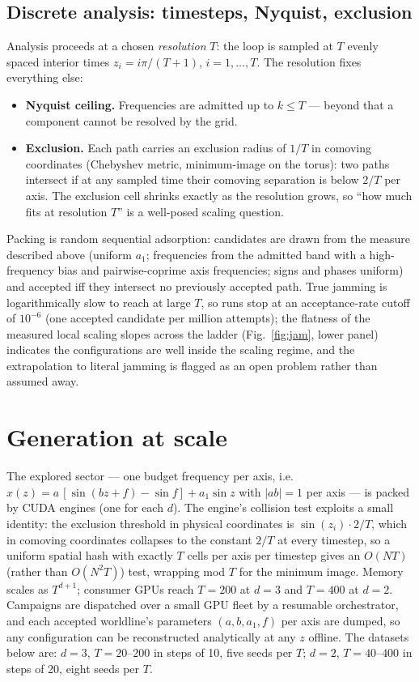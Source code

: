 \documentclass[11pt]{article}
\begin{document}
\subsection{Discrete analysis: timesteps, Nyquist, exclusion}
\label{sec:discrete}

Analysis proceeds at a chosen \emph{resolution} $T$: the loop is sampled at
$T$ evenly spaced interior times $z_i = i\pi/(T{+}1)$, $i = 1,\ldots,T$. The
resolution fixes everything else:
\begin{itemize}
  \item \textbf{Nyquist ceiling.} Frequencies are admitted up to $k \le T$
        --- beyond that a component cannot be resolved by the grid.
  \item \textbf{Exclusion.} Each path carries an exclusion radius of $1/T$
        in comoving coordinates (Chebyshev metric, minimum-image on the
        torus): two paths intersect if at any sampled time their comoving
        separation is below $2/T$ per axis. The exclusion cell shrinks
        exactly as the resolution grows, so ``how much fits at resolution
        $T$'' is a well-posed scaling question.
\end{itemize}
Packing is random sequential adsorption: candidates are drawn from the
measure described above (uniform $a_1$; frequencies from the admitted band
with a high-frequency bias and pairwise-coprime axis frequencies; signs and
phases uniform) and accepted iff they intersect no previously accepted path.
True jamming is logarithmically slow to reach at large $T$, so runs stop at
an acceptance-rate cutoff of $10^{-6}$ (one accepted candidate per million
attempts); the flatness of the measured local scaling slopes across the
ladder (Fig.~\ref{fig:jam}, lower panel) indicates the configurations are
well inside the scaling regime, and the extrapolation to literal jamming is
flagged as an open problem rather than assumed away.

\section{Generation at scale}
\label{sec:method}

The explored sector --- one budget frequency per axis, i.e.
$x(z) = a\,[\sin(bz + f) - \sin f] + a_1 \sin z$ with $|ab| = 1$ per axis ---
is packed by CUDA engines (one for each $d$). The engine's collision test
exploits a small identity: the exclusion threshold in physical coordinates is
$\sin(z_i)\cdot 2/T$, which in comoving coordinates collapses to the constant
$2/T$ at every timestep, so a uniform spatial hash with exactly $T$ cells per
axis per timestep gives an $O(NT)$ (rather than $O(N^2 T)$) test, wrapping
mod $T$ for the minimum image. Memory scales as $T^{d+1}$; consumer GPUs
reach $T = 200$ at $d = 3$ and $T = 400$ at $d = 2$. Campaigns are dispatched
over a small GPU fleet by a resumable orchestrator, and each accepted
worldline's parameters $(a, b, a_1, f)$ per axis are dumped, so any
configuration can be reconstructed analytically at any $z$ offline. The
datasets below are: $d = 3$, $T = 20$--$200$ in steps of 10, five seeds per
$T$; $d = 2$, $T = 40$--$400$ in steps of 20, eight seeds per $T$.
\end{document}
